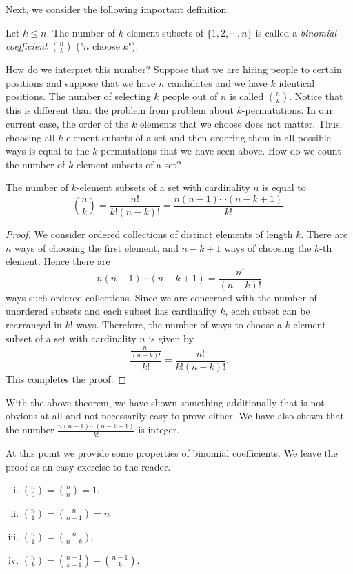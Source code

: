 Next, we consider the following important definition.

\begin{defn}
Let $k \leq n$. The number of $k$-element subsets of $\{1, 2, \cdots, n\}$ is called a \textit{binomial coefficient} ${n \choose k}$ ("$n$ choose $k$").
\end{defn}

How do we interpret this number? Suppose that we are hiring people to certain positions and suppose that we have $n$ candidates and we have $k$ identical positions.
The number of selecting $k$ people out of $n$ is called ${n \choose k}$. Notice that this is different than the problem from problem about $k$-permutations.
In our current case, the order of the $k$ elements that we choose does not matter. Thus, choosing all $k$ element subsets of a set and then ordering them in all possible ways
is equal to the $k$-permutations that we have seen above. How do we count the number of $k$-element subsets of a set?

\begin{theorem}
The number of $k$-element subsets of a set with cardinality $n$ is equal to 
$$
{n \choose k}=\frac{n!}{k!(n-k)!}=\frac{n(n-1)\cdots (n-k+1)}{k!}.
$$
\label{thmBinomial}
\end{theorem}

\begin{proof}
We consider ordered collections of distinct elements of length $k$. There are $n$ ways of choosing the first element, and $n-k+1$ ways of choosing the $k$-th element.
Hence there are 
$$
n(n-1)\cdots (n-k+1)=\frac{n!}{(n-k)!}
$$
ways such ordered collections. Since we are concerned with the number of unordered subsets and each subset has cardinality $k$, each subset can be rearranged in $k!$ ways.
Therefore, the number of ways to choose a $k$-element subset of a set with cardinality $n$ is given by 
$$
\frac{\frac{n!}{(n-k)!}}{k!}=\frac{n!}{k!(n-k)!}.
$$
This completes the proof.
\end{proof}

With the above theorem, we have shown something additionally that is not obvious at all and not necessarily easy to prove either.
We have also shown that the number $\frac{n(n-1)\cdots (n-k+1)}{k!}$ is integer.

At this point we provide some properties of binomial coefficients. We leave the proof as an easy exercise to the reader.

\begin{enumerate}[(i)]
    \item $\displaystyle {n \choose 0}={n \choose n}=1$.
    \item $\displaystyle {n \choose 1}={n \choose n-1}=n$
    \item $\displaystyle {n \choose 1}={n \choose n-k}$.
    \item $\displaystyle {n \choose k}={n - 1 \choose k -1} + {n - 1 \choose k}$.
\end{enumerate}

